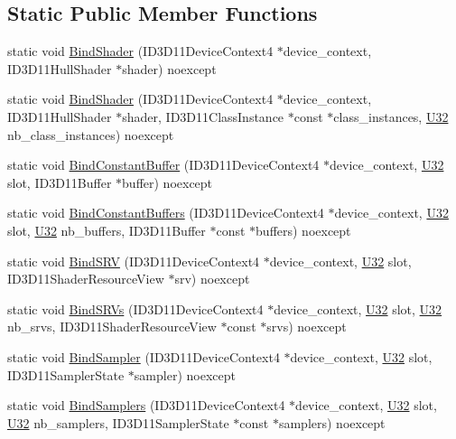 \subsection*{Static Public Member Functions}
\begin{DoxyCompactItemize}
\item 
static void \hyperlink{structmage_1_1_pipeline_1_1_h_s_ab8e7dc82b2f7e9e06f49b0b13f48b99f}{Bind\+Shader} (I\+D3\+D11\+Device\+Context4 $\ast$device\+\_\+context, I\+D3\+D11\+Hull\+Shader $\ast$shader) noexcept
\item 
static void \hyperlink{structmage_1_1_pipeline_1_1_h_s_a85e53d06ba56c798511d6e9c877d53b7}{Bind\+Shader} (I\+D3\+D11\+Device\+Context4 $\ast$device\+\_\+context, I\+D3\+D11\+Hull\+Shader $\ast$shader, I\+D3\+D11\+Class\+Instance $\ast$const $\ast$class\+\_\+instances, \hyperlink{namespacemage_a41c104c036fba3756a74e19f793eeaa1}{U32} nb\+\_\+class\+\_\+instances) noexcept
\item 
static void \hyperlink{structmage_1_1_pipeline_1_1_h_s_a2f27f298f771b4b9f7519200eae3599c}{Bind\+Constant\+Buffer} (I\+D3\+D11\+Device\+Context4 $\ast$device\+\_\+context, \hyperlink{namespacemage_a41c104c036fba3756a74e19f793eeaa1}{U32} slot, I\+D3\+D11\+Buffer $\ast$buffer) noexcept
\item 
static void \hyperlink{structmage_1_1_pipeline_1_1_h_s_ab95856e2e58955b77cdbe2380f3118bb}{Bind\+Constant\+Buffers} (I\+D3\+D11\+Device\+Context4 $\ast$device\+\_\+context, \hyperlink{namespacemage_a41c104c036fba3756a74e19f793eeaa1}{U32} slot, \hyperlink{namespacemage_a41c104c036fba3756a74e19f793eeaa1}{U32} nb\+\_\+buffers, I\+D3\+D11\+Buffer $\ast$const $\ast$buffers) noexcept
\item 
static void \hyperlink{structmage_1_1_pipeline_1_1_h_s_a08186bbe826fdfadf9f268ed815cc035}{Bind\+S\+RV} (I\+D3\+D11\+Device\+Context4 $\ast$device\+\_\+context, \hyperlink{namespacemage_a41c104c036fba3756a74e19f793eeaa1}{U32} slot, I\+D3\+D11\+Shader\+Resource\+View $\ast$srv) noexcept
\item 
static void \hyperlink{structmage_1_1_pipeline_1_1_h_s_a4b5c30e7480fa0b211e46d8ec63ca0db}{Bind\+S\+R\+Vs} (I\+D3\+D11\+Device\+Context4 $\ast$device\+\_\+context, \hyperlink{namespacemage_a41c104c036fba3756a74e19f793eeaa1}{U32} slot, \hyperlink{namespacemage_a41c104c036fba3756a74e19f793eeaa1}{U32} nb\+\_\+srvs, I\+D3\+D11\+Shader\+Resource\+View $\ast$const $\ast$srvs) noexcept
\item 
static void \hyperlink{structmage_1_1_pipeline_1_1_h_s_a52dd9f3167987f99c03829720cd4aa8a}{Bind\+Sampler} (I\+D3\+D11\+Device\+Context4 $\ast$device\+\_\+context, \hyperlink{namespacemage_a41c104c036fba3756a74e19f793eeaa1}{U32} slot, I\+D3\+D11\+Sampler\+State $\ast$sampler) noexcept
\item 
static void \hyperlink{structmage_1_1_pipeline_1_1_h_s_ad1f8748e560266d122025e49af2dc7e7}{Bind\+Samplers} (I\+D3\+D11\+Device\+Context4 $\ast$device\+\_\+context, \hyperlink{namespacemage_a41c104c036fba3756a74e19f793eeaa1}{U32} slot, \hyperlink{namespacemage_a41c104c036fba3756a74e19f793eeaa1}{U32} nb\+\_\+samplers, I\+D3\+D11\+Sampler\+State $\ast$const $\ast$samplers) noexcept
\end{DoxyCompactItemize}
